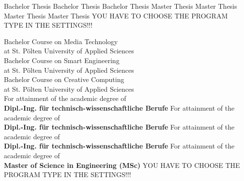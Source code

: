 \begin{center}

\vspace{1cm}

\begin{minipage}[t][5cm][s]{\textwidth}%
\centering
\Huge{{\color{FH2}{\fontsize{24}{30} \selectfont \workTitle\\}}}
\vspace{0.5cm}
\LARGE{{\color{FH2}{\fontsize{16}{24} \selectfont \subTitle\\}}}
\end{minipage}

\vspace{1cm}


\ifUseBachelorMediaTechnologies
	\LARGE{Bachelor Thesis}
\else
	\ifUseBachelorSmartEngineering
		\LARGE{Bachelor Thesis}
\else
	\ifUseBachelorCreativeComputing
		\LARGE{Bachelor Thesis}
\else
	\ifUseMasterInteractiveTechnologies
		\LARGE{Master Thesis}
\else
	\ifUseMasterDigitalDesign
		\LARGE{Master Thesis}
\else
    \ifUseMasterDigitalMediaProduction
		\LARGE{Master Thesis}
\else
	\ifUseMasterDigitalHealthCare
		\LARGE{Master Thesis}
    \else
        \LARGE{YOU HAVE TO CHOOSE THE PROGRAM TYPE IN THE SETTINGS!!!}
  	\fi
\fi
\fi
\fi\fi\fi\fi
  
\vspace{1.3cm}
\ifUseBachelorMediaTechnologies
		\fontsize{11pt}{15pt}\selectfont Bachelor Course on Media Technology\\
at St. Pölten University of Applied Sciences\\  
\else
	\ifUseBachelorSmartEngineering
		\fontsize{11pt}{15pt}\selectfont Bachelor Course on Smart Engineering\\
at St. Pölten University of Applied Sciences\\  
\else
	\ifUseBachelorCreativeComputing
		\fontsize{11pt}{15pt}\selectfont Bachelor Course on Creative Computing\\
at St. Pölten University of Applied Sciences\\  
\else
	\ifUseMasterInteractiveTechnologies
		\fontsize{11pt}{15pt}\selectfont For attainment of the academic degree of\\
		\textbf{Dipl.-Ing. für technisch-wissenschaftliche Berufe}
\else
    \ifUseMasterDigitalDesign
		\fontsize{11pt}{15pt}\selectfont For attainment of the academic degree of\\
		\textbf{Dipl.-Ing. für technisch-wissenschaftliche Berufe}
\else
    \ifUseMasterDigitalMediaProduction
		\fontsize{11pt}{15pt}\selectfont For attainment of the academic degree of\\
		\textbf{Dipl.-Ing. für technisch-wissenschaftliche Berufe}
\else
	\ifUseMasterDigitalHealthCare
    	\fontsize{11pt}{15pt}\selectfont For attainment of the academic degree of\\
		\textbf{Master of Science in Engineering (MSc)}
    \else
        \LARGE{YOU HAVE TO CHOOSE THE PROGRAM TYPE IN THE SETTINGS!!!}
  	\fi
\fi
\fi
\fi\fi\fi
\fi


\end{center}
